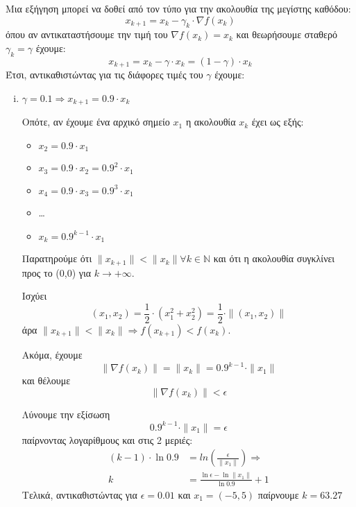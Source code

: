 \hfill \break
\hfill \break
\noindent Μια εξήγηση μπορεί να δοθεί από τον τύπο για την ακολουθία της μεγίστης καθόδου: 
\begin{equation}
	x_{k + 1} = x_k - \gamma_k \cdot \nabla f(x_k) 
\end{equation}
όπου αν αντικαταστήσουμε την τιμή του $\nabla f(x_k) = x_k$ και θεωρήσουμε σταθερό $\gamma_k = \gamma$ έχουμε:
\begin{equation}
	x_{k + 1} = x_k - \gamma \cdot x_k = (1- \gamma) \cdot x_k
\end{equation}
\hfill \break
\noindent Έτσι, αντικαθιστώντας για τις διάφορες τιμές του $\gamma$ έχουμε:
\begin{enumerate}[i)]
	\item $\gamma = 0.1 \Rightarrow x_{k + 1} = 0.9 \cdot x_k$
	
	Οπότε, αν έχουμε ένα αρχικό σημείο $x_1$ η ακολουθία $x_k$ έχει ως εξής:
	\begin{itemize}
		\item $x_2 = 0.9 \cdot x_1$
		\item $x_3 = 0.9 \cdot x_2 = 0.9^2 \cdot x_1$
		\item $x_4 = 0.9 \cdot x_3 = 0.9^3 \cdot x_1$
		\item \ldots
		\item $x_k = 0.9^{k-1} \cdot x_1$
	\end{itemize}
	
	Παρατηρούμε ότι $\parallel x_{k+1} \parallel < \parallel x_{k} \parallel \forall k \in \mathbb{N}$ και ότι η ακολουθία συγκλίνει προς το (0,0) για $k \to +\infty$.
	
	Ισχύει
	\begin{equation}
		(x_1, x_2) = \frac{1}{2} \cdot (x_1^2 + x_2^2) = \frac{1}{2} \cdot \parallel (x_1, x_2) \parallel
	\end{equation} άρα	$\parallel x_{k+1} \parallel < \parallel x_{k} \parallel \Rightarrow f(x_{k+1}) < f(x_k)$.
	
	Ακόμα, έχουμε 
	\begin{equation}
		\parallel \nabla f(x_k) \parallel = \parallel x_k \parallel = 0.9^{k-1} \cdot \parallel x_1 \parallel
	\end{equation}
	και θέλουμε 
	\begin{equation}
		\label{eq:while_termination}
		\parallel \nabla f(x_k) \parallel < \epsilon
	\end{equation}
	
	Λύνουμε την εξίσωση \[ 0.9^{k-1} \cdot \parallel x_1 \parallel = \epsilon \] 
	παίρνοντας λογαρίθμους και στις 2 μεριές: 
	\begin{align*}
		 (k - 1) \cdot \ln 0.9 &= ln(\frac{\epsilon}{\parallel x_1 \parallel}) \Rightarrow \\
		 k &= \frac{\ln \epsilon - \ln \parallel x_1 \parallel}{\ln 0.9} + 1
	\end{align*}
	Τελικά, αντικαθιστώντας για $\epsilon = 0.01$ και $x_1 = (-5, 5)$ παίρνουμε $k = 63.27$
	

\end{enumerate}

